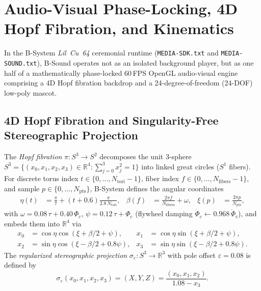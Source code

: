 \chapter{Audio-Visual Phase-Locking, 4D Hopf Fibration, and Kinematics}
\label{ch:kinematics}

In the B-System \emph{Lil~Cu~64} ceremonial runtime (\texttt{MEDIA-SDK.txt} and \texttt{MEDIA-SOUND.txt}), B-Sound operates not as an isolated background player, but as one half of a mathematically phase-locked 60\,FPS OpenGL audio-visual engine comprising a 4D Hopf fibration backdrop and a 24-degree-of-freedom (24-DOF) low-poly mascot.

\section{4D Hopf Fibration and Singularity-Free Stereographic Projection}

\begin{definition}
The \emph{Hopf fibration} $\pi : S^3 \to S^2$ decomposes the unit 3-sphere $S^3 = \{(x_0, x_1, x_2, x_3) \in \mathbb{R}^4 : \sum_{j=0}^3 x_j^2 = 1\}$ into linked great circles ($S^1$ fibers). For discrete torus index $t \in \{0,\dots,N_{\mathrm{tori}}-1\}$, fiber index $f \in \{0,\dots,N_{\mathrm{fibers}}-1\}$, and sample $p \in \{0,\dots,N_{\mathrm{pts}}\}$, B-System defines the angular coordinates
\begin{align}
\eta(t) &= \frac{\pi}{7} + (t + 0.6)\frac{\pi}{2.8\,N_{\mathrm{tori}}}, &
\beta(f) &= \frac{2\pi f}{N_{\mathrm{fibers}}} + \omega, &
\xi(p) &= \frac{2\pi p}{N_{\mathrm{pts}}},
\end{align}
with $\omega = 0.08\,\tau + 0.40\,\Phi_c$, $\psi = 0.12\,\tau + \Phi_c$ (flywheel damping $\dot{\Phi}_c \leftarrow 0.968\,\dot{\Phi}_c$), and embeds them into $\mathbb{R}^4$ via
\begin{align}
\label{eq:hopf-s3}
x_0 &= \cos\eta\cos(\xi + \beta/2 + \psi), & x_1 &= \cos\eta\sin(\xi + \beta/2 + \psi), \\
x_2 &= \sin\eta\cos(\xi - \beta/2 + 0.8\psi), & x_3 &= \sin\eta\sin(\xi - \beta/2 + 0.8\psi).
\end{align}
The \emph{regularized stereographic projection} $\sigma_\varepsilon : S^3 \to \mathbb{R}^3$ with pole offset $\varepsilon = 0.08$ is defined by
\begin{equation}
\label{eq:hopf-proj}
\sigma_\varepsilon(x_0, x_1, x_2, x_3) = (X, Y, Z) = \frac{(x_0, x_1, x_2)}{1.08 - x_3}.
\end{equation}
\end{definition}

